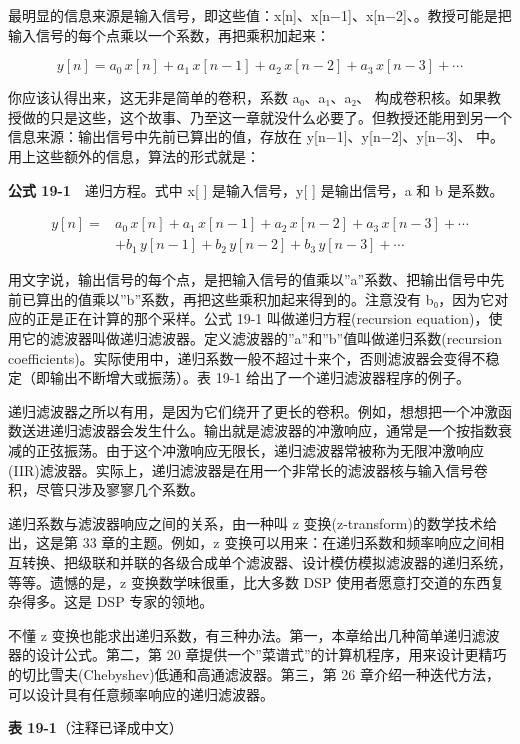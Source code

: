最明显的信息来源是输入信号，即这些值：x{[}n{]}、x{[}n−1{]}、x{[}n−2{]}、。教授可能是把输入信号的每个点乘以一个系数，再把乘积加起来：

\[y[n] = a_0\,x[n] + a_1\,x[n-1] + a_2\,x[n-2] + a_3\,x[n-3] + \cdots\]

你应该认得出来，这无非是简单的卷积，系数 a₀、a₁、a₂、
构成卷积核。如果教授做的只是这些，这个故事、乃至这一章就没什么必要了。但教授还能用到另一个信息来源：输出信号中先前已算出的值，存放在
y{[}n−1{]}、y{[}n−2{]}、y{[}n−3{]}、
中。用上这些额外的信息，算法的形式就是：

\textbf{公式 19-1}　递归方程。式中 x{[} {]} 是输入信号，y{[} {]}
是输出信号，a 和 b 是系数。

\[\begin{aligned} y[n] = {}& a_0\,x[n] + a_1\,x[n-1] + a_2\,x[n-2] + a_3\,x[n-3] + \cdots \\ & + b_1\,y[n-1] + b_2\,y[n-2] + b_3\,y[n-3] + \cdots \end{aligned}\]

用文字说，输出信号的每个点，是把输入信号的值乘以''a''系数、把输出信号中先前已算出的值乘以''b''系数，再把这些乘积加起来得到的。注意没有
b₀，因为它对应的正是正在计算的那个采样。公式 19-1 叫做递归方程(recursion
equation)，使用它的滤波器叫做递归滤波器。定义滤波器的''a''和''b''值叫做递归系数(recursion
coefficients)。实际使用中，递归系数一般不超过十来个，否则滤波器会变得不稳定（即输出不断增大或振荡）。表
19-1 给出了一个递归滤波器程序的例子。

递归滤波器之所以有用，是因为它们绕开了更长的卷积。例如，想想把一个冲激函数送进递归滤波器会发生什么。输出就是滤波器的冲激响应，通常是一个按指数衰减的正弦振荡。由于这个冲激响应无限长，递归滤波器常被称为无限冲激响应(IIR)滤波器。实际上，递归滤波器是在用一个非常长的滤波器核与输入信号卷积，尽管只涉及寥寥几个系数。

递归系数与滤波器响应之间的关系，由一种叫 z
变换(z-transform)的数学技术给出，这是第 33 章的主题。例如，z
变换可以用来：在递归系数和频率响应之间相互转换、把级联和并联的各级合成单个滤波器、设计模仿模拟滤波器的递归系统，等等。遗憾的是，z
变换数学味很重，比大多数 DSP 使用者愿意打交道的东西复杂得多。这是 DSP
专家的领地。

不懂 z
变换也能求出递归系数，有三种办法。第一，本章给出几种简单递归滤波器的设计公式。第二，第
20
章提供一个''菜谱式''的计算机程序，用来设计更精巧的切比雪夫(Chebyshev)低通和高通滤波器。第三，第
26 章介绍一种迭代方法，可以设计具有任意频率响应的递归滤波器。

\textbf{表 19-1}（注释已译成中文）

